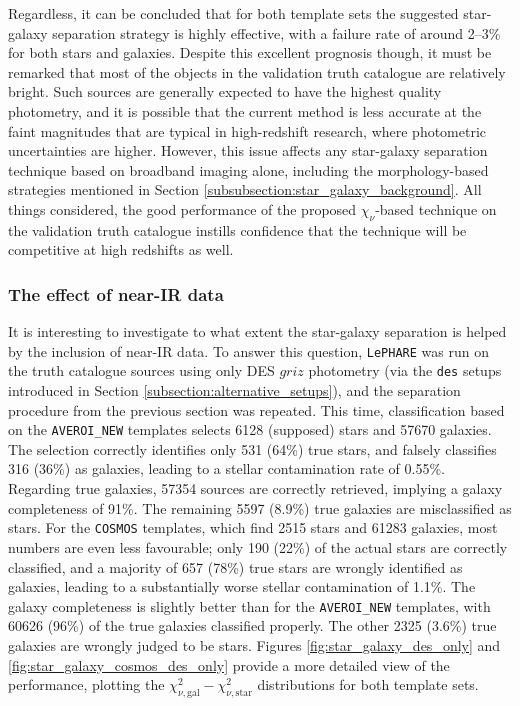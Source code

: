Regardless, it can be concluded that for both template sets the suggested star-galaxy separation strategy  is highly effective, with a failure rate of around 2--3\% for both stars and galaxies. Despite this excellent prognosis though, it must be remarked that most of the objects in the validation truth catalogue are relatively bright. Such sources are generally expected to have the highest quality photometry, and it is possible that the current method is less accurate at the faint magnitudes that are typical in high-redshift research, where photometric uncertainties are higher. However, this issue  affects any star-galaxy separation technique based on broadband imaging alone, including the morphology-based strategies mentioned in Section \ref{subsubsection:star_galaxy_background}. All things considered, the good performance of the proposed $\chi_{\nu}$-based technique on the validation truth catalogue instills confidence that the technique will be competitive at high redshifts as well. \par


\subsubsection{The effect of near-IR data}\label{subsubsection:method_validation_near_IR}
It is interesting to investigate to what extent the star-galaxy separation is helped by the inclusion of near-IR data. To answer this question, \texttt{LePHARE} was run on the truth catalogue sources using only DES $griz$ photometry (via the \texttt{des} setups introduced in Section \ref{subsection:alternative_setups}), and the separation procedure from the previous section was repeated.  This time, classification based on the \texttt{AVEROI\_NEW} templates selects 6128 (supposed) stars and \num{57 670} galaxies. The selection correctly identifies only 531 (64\%) true stars, and falsely classifies 316 (36\%) as galaxies, leading to a stellar contamination rate of 0.55\%. Regarding true galaxies, \num{57354} sources are correctly retrieved, implying a galaxy completeness of 91\%. The remaining 5597 (8.9\%) true galaxies are misclassified as stars. For the \texttt{COSMOS} templates, which find 2515 stars and \num{61 283} galaxies, most numbers are even less favourable; only 190 (22\%) of the actual stars are correctly classified, and a majority of 657  (78\%) true stars are wrongly identified as galaxies, leading to a substantially worse stellar contamination of 1.1\%. The galaxy completeness is slightly better than for the \texttt{AVEROI\_NEW} templates, with \num{60 626} (96\%) of the true galaxies classified properly. The other 2325 (3.6\%) true galaxies are wrongly judged to be stars. Figures \ref{fig:star_galaxy_des_only} and \ref{fig:star_galaxy_cosmos_des_only} provide a more detailed view of the performance, plotting the $\chi^2_{\nu,\mathrm{gal}} - \chi^2_{\nu,\mathrm{star}}$ distributions for both template sets. \par




